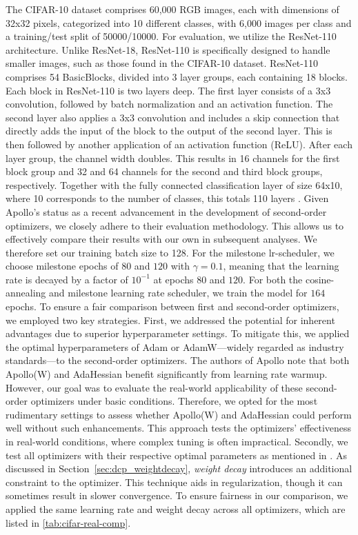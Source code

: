 The CIFAR-10 dataset comprises 60,000 RGB images, each with dimensions of 32x32 pixels,
categorized into 10 different classes, with 6,000 images per class and a training/test split of 50000/10000.
For evaluation, we utilize the ResNet-110 architecture.
Unlike ResNet-18, ResNet-110 is specifically designed to handle smaller images,
such as those found in the CIFAR-10 dataset. ResNet-110 comprises 54 BasicBlocks,
divided into 3 layer groups, each containing 18 blocks. Each block in ResNet-110 is two layers deep.
The first layer consists of a 3x3 convolution, followed by batch normalization and an
activation function. The second layer also applies a 3x3 convolution and includes a
skip connection that directly adds the input of the block to the output of the second
layer. This is then followed by another application of an activation function (ReLU).
After each layer group, the channel width doubles. This results in 16 channels for the first block group and 32 and 64 channels
for the second and third block groups, respectively.
Together with the fully connected classification layer of size 64x10, where 10 corresponds to the number of classes,
this totals 110 layers \cite{Resnet110}.
Given Apollo's status as a recent advancement in the development of second-order optimizers,
we closely adhere to their evaluation methodology. This allows us to effectively compare their results
with our own in subsequent analyses. We therefore set our training batch size to 128. 
For the milestone lr-scheduler, we choose milestone epochs of $80$ and $120$ with
$\gamma=0.1$, meaning that the learning rate is decayed by a factor of $10^{-1}$ at 
epochs $80$ and $120$. For both the cosine-annealing and milestone learning rate scheduler, we train the model
for $164$ epochs. 
To ensure a fair comparison between first and second-order optimizers, we employed two key strategies.
First, we addressed the potential for inherent advantages due to superior hyperparameter settings.
To mitigate this, we applied the optimal hyperparameters of Adam or AdamW—widely regarded as industry
standards—to the second-order optimizers.
The authors of Apollo \cite{apollo} note that both Apollo(W) and AdaHessian benefit significantly
from learning rate warmup. However, our goal was to evaluate the real-world applicability of
these second-order optimizers under basic conditions. Therefore, we opted for the most
rudimentary settings to assess whether Apollo(W) and AdaHessian could perform well
without such enhancements.
This approach tests the optimizers' effectiveness in real-world conditions,
where complex tuning is often impractical. Secondly, we test all optimizers with their
respective optimal parameters as mentioned in \cite{apollo}.
As discussed in Section~\ref{sec:dcp_weightdecay}, \emph{weight decay} introduces
an additional constraint to the optimizer. This technique aids in regularization,
though it can sometimes result in slower convergence.
To ensure fairness in our comparison, we applied the same learning rate and weight decay across all optimizers,
which are listed in \ref{tab:cifar-real-comp}.

